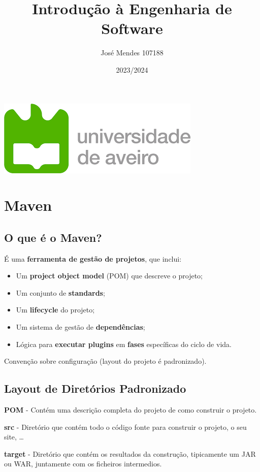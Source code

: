 \documentclass{article}
\title{Introdução à Engenharia de Software}
\author{José Mendes 107188}
\date{2023/2024}
\begin{document}
\begin{titlepage}
    \maketitle
    \begin{center}
        \includegraphics[scale=0.4]{UA.png}
    \end{center}
    \thispagestyle{empty} %
\end{titlepage}

\pagebreak

\section{Maven}

\subsection{O que é o Maven?}

É uma \textbf{ferramenta de gestão de projetos}, que inclui:
\begin{itemize}
  \item Um \textbf{project object model} (POM) que descreve o projeto;
  \item Um conjunto de \textbf{standards};
  \item Um \textbf{lifecycle} do projeto;
  \item Um sistema de gestão de \textbf{dependências};
  \item Lógica para \textbf{executar plugins} em \textbf{fases} específicas
  do ciclo de vida.
\end{itemize}

Convenção sobre configuração (layout do projeto é padronizado).

\subsection{Layout de Diretórios Padronizado}

\begin{flushleft}
  \textbf{POM} - Contém uma descrição completa do projeto de como
  construir o projeto.

  \vspace{2mm}

  \textbf{src} - Diretório que contém todo o código fonte para construir
  o projeto, o seu site, \dots

  \vspace{2mm}

  \textbf{target} - Diretório que contém os resultados da construção,
  tipicamente um JAR ou WAR, juntamente com os ficheiros intermedios.
\end{flushleft}
\end{document}
